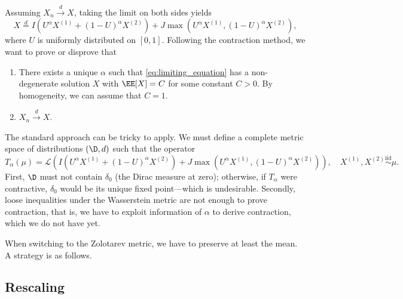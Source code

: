 Assuming $X_n\xrightarrow{d} X$, taking the limit on both sides yields
\begin{equation}
  \label{eq:limiting_equation}
  X \stackrel{d}{=} I\left(U^\alpha X^{(1)} + \left(1-U\right)^\alpha X^{(2)}\right) + J\max\left(U^\alpha X^{(1)}, \left(1-U\right)^\alpha X^{(2)}\right),
\end{equation}
where $U$ is uniformly distributed on $[0,1]$. Following the contraction method, we want to prove or disprove that
\begin{enumerate}
  \item There exists a unique $\alpha$ such that \eqref{eq:limiting_equation} has a non-degenerate solution $X$ with $\EE[X]=C$ for some constant $C>0$. By homogeneity, we can assume that $C=1$.
  \item $X_n\xrightarrow{d} X$.
\end{enumerate}

The standard approach can be tricky to apply. We must define a complete metric space of distributions $(\D, d)$ such that the operator
\begin{equation}
  \label{eq:operator_T}
  T_\alpha(\mu) = \mathcal{L}\left(I\left(U^\alpha X^{(1)} + \left(1-U\right)^\alpha X^{(2)}\right) + J\max\left(U^\alpha X^{(1)}, \left(1-U\right)^\alpha X^{(2)}\right)\right), \quad X^{(1)}, X^{(2)} \stackrel{\text{iid}}{\sim} \mu.
\end{equation}
First, $\D$ must not contain $\delta_0$ (the Dirac measure at zero); otherwise, if $T_\alpha$ were contractive, $\delta_0$ would be its unique fixed point---which is undesirable. Secondly, loose inequalities under the Wasserstein metric are not enough to prove contraction, that is, we have to exploit information of $\alpha$ to derive contraction, which we do not have yet.

When switching to the Zolotarev metric, we have to preserve at least the mean. A strategy is as follows.

\subsection{Rescaling}

